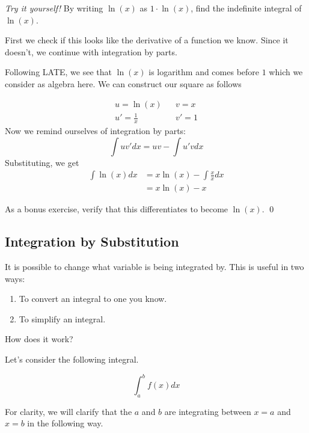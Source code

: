 \begin{exercise} \emph{Try it yourself!} \label{ex:integral-ln}
    By writing $\ln (x)$ as $1 \cdot \ln (x)$, find the indefinite integral of $\ln (x)$.
\end{exercise}
\begin{solution}
    First we check if this looks like the derivative of a function we know. Since it doesn't, we continue with integration by parts.

    Following LATE, we see that $\ln(x)$ is logarithm and comes before $1$ which we consider as algebra here. We can construct our square as follows

        \begin{align*}
        u = \ln (x) & & v= x \\
        u' = \frac{1}{x} & & v' = 1
    \end{align*}
    Now we remind ourselves of integration by parts:
    \[ \int u v' dx = uv - \int u' v dx \]
    Substituting, we get
    \begin{align*}
        \int \ln (x) dx &= x \ln (x) - \int \frac{x}{x} dx\\
        &= x \ln(x) - x
    \end{align*}

    As a bonus exercise, verify that this differentiates to become $\ln(x)$.
    \qed
\end{solution}





\subsection{Integration by Substitution} \label{sec:int-subs}

It is possible to change what variable is being integrated by. This is useful in two ways:

\begin{enumerate}
    \item To convert an integral to one you know.
    \item To simplify an integral.
\end{enumerate}

How does it work?

Let's consider the following integral.

\[ \int_{a}^{b} f(x) dx\]

For clarity, we will clarify that the $a$ and $b$ are integrating between $x=a$ and $x=b$ in the following way.

